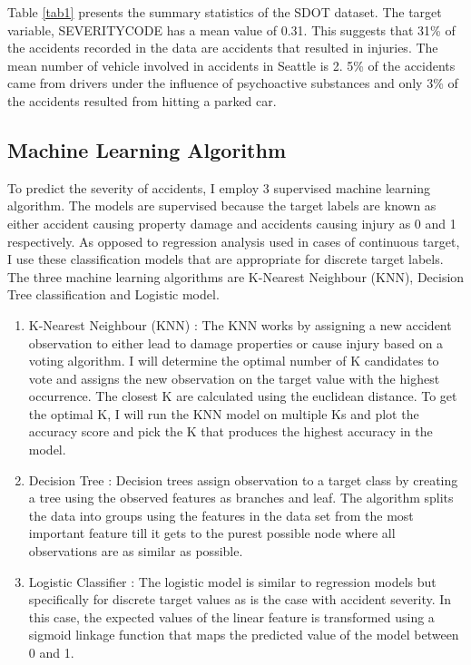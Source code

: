 \documentclass[a4paper,12pt]{article}
\begin{document}
Table \ref{tab1} presents the summary statistics of the SDOT dataset. The target variable, SEVERITYCODE has a mean value of 0.31. This suggests that 31\% of the accidents recorded in the data are accidents that resulted in injuries. The mean number of vehicle involved in accidents in Seattle is 2. 5\% of the accidents came from drivers under the influence of psychoactive substances and only 3\% of the accidents resulted from hitting a parked car.

\subsection{Machine Learning Algorithm}
To predict the severity of accidents, I employ 3 supervised machine learning algorithm. The models are supervised because the target labels are known as either accident causing property damage and accidents causing injury as 0 and 1 respectively. As opposed to regression analysis used in cases of continuous target, I use these classification models that are appropriate for discrete target labels. The three machine learning algorithms are K-Nearest Neighbour (KNN), Decision Tree classification and Logistic model.

\begin{enumerate}
  \item K-Nearest Neighbour (KNN) : The KNN works by assigning a new accident observation to either lead to damage properties or cause injury based on a voting algorithm. I will determine the optimal number of K candidates to vote and assigns the new observation on the target value with the highest occurrence. The closest K are calculated using the euclidean distance. To get the optimal K, I will run the KNN model on multiple Ks and plot the accuracy score and pick the K that produces the highest accuracy in the model.

  \item Decision Tree : Decision trees assign observation to a target class by creating a tree using the observed features as branches and leaf. The algorithm splits the data into groups using the features in the data set from the most important feature till it gets to the purest possible node where all observations are as similar as possible.

  \item Logistic Classifier : The logistic model is similar to regression models but specifically for discrete target values as is the case with accident severity. In this case, the expected values of the linear feature is transformed using a sigmoid linkage function that maps the predicted value of the model between 0 and 1.
\end{enumerate}
\end{document}
